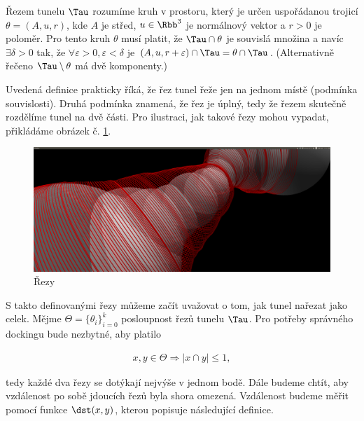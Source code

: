 \begin{defi}
Řezem tunelu $ \Tau $ rozumíme kruh v prostoru, který je určen uspořádanou trojicí
$\theta = (A, u, r)$, kde $ A $ je střed, $ u \in \Rbb^3 $ je normálnový vektor a $ r > 0 $ je poloměr.
Pro tento kruh $ \theta $ musí platit, že $ \Tau \cap \theta $ je souvislá množina a navíc
$ \exists \delta > 0 $ tak, že $ \forall \varepsilon > 0,  \varepsilon < \delta $ je
$ (A, u, r + \varepsilon) \cap \Tau = \theta \cap \Tau $.
(Alternativně řečeno $\Tau \setminus \theta $ má dvě komponenty.)
\end{defi}

Uvedená definice prakticky říká, že řez tunel řeže jen na jednom místě (podmínka souvislosti).
Druhá podmínka znamená, že řez je úplný, tedy že řezem skutečně rozdělíme tunel na dvě části.
Pro ilustraci, jak takové řezy mohou vypadat, přikládáme obrázek č. \ref{fig:tunnel_cuts}.
\begin{figure}[ht]
    \centering
    \includegraphics[width=\textwidth]{img/simple_cuts.png}
    \caption{Řezy}
  \centering
  \label{fig:tunnel_cuts}
\end{figure}

S takto definovanými řezy můžeme začít uvažovat o tom, jak tunel nařezat jako celek.
Mějme $ \Theta = \{\theta_i\}_{i=0}^{k}$ posloupnost řezů tunelu $ \Tau $. Pro potřeby správného
dockingu bude nezbytné, aby platilo

\begin{align}
x, y \in \Theta \Rightarrow |x \cap y| \leq 1, \label{cond:not_intersecting}
\end{align}

tedy každé dva řezy se dotýkají nejvýše v jednom bodě. Dále budeme chtít, aby vzdálenost
po sobě jdoucích řezů byla shora omezená. Vzdálenost budeme měřit pomocí funkce
$ \dst(x, y) $, kterou popisuje následující definice.

